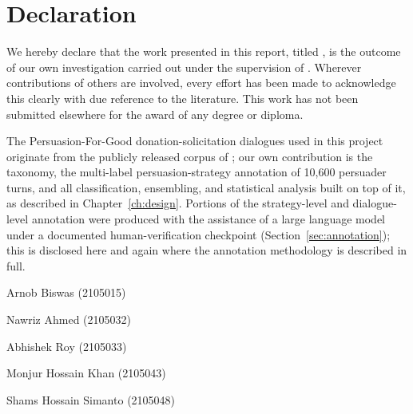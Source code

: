 \chapter*{Declaration}

We hereby declare that the work presented in this report, titled
\textbf{\ProjectTitle}, is the outcome of our own investigation carried out
under the supervision of \Supervisors. Wherever contributions of others are
involved, every effort has been made to acknowledge this clearly with due
reference to the literature. This work has not been submitted elsewhere for
the award of any degree or diploma.

The Persuasion-For-Good donation-solicitation dialogues used in this project
originate from the publicly released corpus of \citet{wang2019persuasion};
our own contribution is the taxonomy, the multi-label persuasion-strategy
annotation of 10{,}600 persuader turns, and all classification, ensembling,
and statistical analysis built on top of it, as described in
Chapter~\ref{ch:design}. Portions of the strategy-level and dialogue-level
annotation were produced with the assistance of a large language model under
a documented human-verification checkpoint (Section~\ref{sec:annotation});
this is disclosed here and again where the annotation methodology is
described in full.

\vspace{2cm}
\begin{teammembers}
    \item Arnob Biswas \hfill \textnormal{(2105015)}
    \item Nawriz Ahmed \hfill \textnormal{(2105032)}
    \item Abhishek Roy \hfill \textnormal{(2105033)}
    \item Monjur Hossain Khan \hfill \textnormal{(2105043)}
    \item Shams Hossain Simanto \hfill \textnormal{(2105048)}
\end{teammembers}
